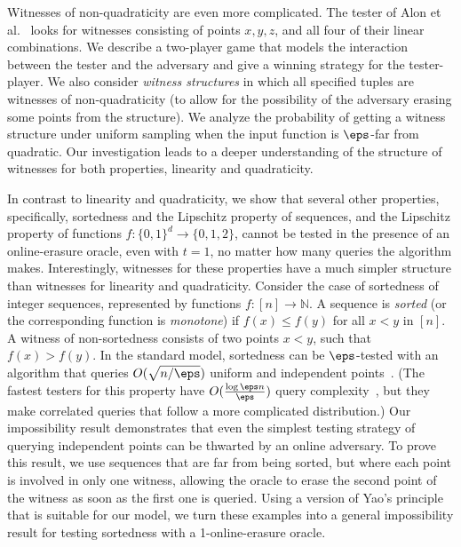 \documentclass{toc}
\begin{document}
Witnesses of non-quadraticity are even more complicated. 
The tester of Alon et al.~\cite{AlonKKLR05} looks for witnesses consisting of points $x,y,z$, and all four of their linear combinations.
We describe a two-player game that models the interaction between the tester and the adversary and give a winning strategy for the tester-player. We also consider {\em witness structures} in which all specified tuples are witnesses of non-quadraticity (to allow for the possibility of the adversary erasing some points from the structure). We analyze the probability of getting a witness structure under uniform sampling when the input function is $\eps$-far from quadratic.
Our investigation leads to a deeper understanding of the structure of witnesses for both properties, linearity and quadraticity.

In contrast to linearity and quadraticity, we show that several other properties, specifically, sortedness and the Lipschitz property of sequences, and the Lipschitz property of functions $f:\{0,1\}^d\to\{0,1,2\}$, cannot be tested in the presence of an online-erasure oracle, even with $t=1$, no matter how many queries the algorithm makes. Interestingly, witnesses for these properties have a much simpler structure than witnesses for linearity and quadraticity. Consider the case of sortedness  of integer sequences, represented by functions $f:[n]\to\mathbb{N}.$ A sequence is {\em sorted} (or the corresponding function is {\em monotone}) if $f(x) \leq f(y)$ for all $x< y $ in $[n]$.
A witness of non-sortedness consists of two points $x<y$, such that $f(x)>f(y).$
In the standard model, sortedness can be $\eps$-tested with an algorithm that queries $O(\sqrt{n/\eps})$ uniform and independent points~\cite{FLNRRS02}. (The fastest testers for this property have $O(\frac{\log \eps n}\eps)$ query complexity~\cite{EKKRV00,DGLRRS99,BGJRW12,CS13,Belovs18}, but 
they make correlated queries that follow a more complicated distribution.) Our impossibility result demonstrates that even the simplest 
testing strategy of querying independent points
can be thwarted by an online adversary. 
To prove this result, we use sequences that are far from being sorted, but where each point is involved in only one witness, allowing the oracle to erase the second point of the witness as soon as the first one is queried. Using a version of Yao's principle that is suitable for our model, we turn these examples into a general impossibility result for testing sortedness with a 1-online-erasure oracle.
\end{document}
